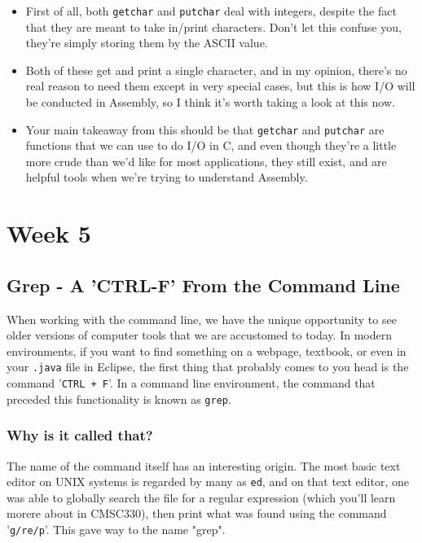 \documentclass[english, 10pt]{article}
\begin{document}
\begin{itemize}
	\item First of all, both \texttt{getchar} and \texttt{putchar} deal with integers, despite the fact that they are meant to take in/print characters. Don't let this confuse you, they're simply storing them by the ASCII value.
	\item Both of these get and print a single character, and in my opinion, there's no real reason to need them except in very special cases, but this is how I/O will be conducted in Assembly, so I think it's worth taking a look at this now.
	\item Your main takeaway from this should be that \texttt{getchar} and \texttt{putchar} are functions that we can use to do I/O in C, and even though they're a little more crude than we'd like for most applications, they still exist, and are helpful tools when we're trying to understand Assembly.
\end{itemize}

\section{Week 5}

\subsection{Grep - A 'CTRL-F' From the Command Line}

When working with the command line, we have the unique opportunity to see older versions of computer tools that we are accustomed to today. In modern environments, if you want to find something on a webpage, textbook, or even in your \texttt{.java} file in Eclipse, the first thing that probably comes to you head is the command '\texttt{CTRL + F}'. In a command line environment, the command that preceded this functionality is known as \texttt{grep}. 

\subsubsection{Why is it called that?}
The name of the command itself has an interesting origin. The most basic text editor on UNIX systems is regarded by many as \texttt{ed}, and on that text editor, one was able to globally search the file for a regular expression (which you'll learn morere about in CMSC330), then print what was found using the command '\texttt{g/re/p}'. This gave way to the name "grep".
\end{document}
